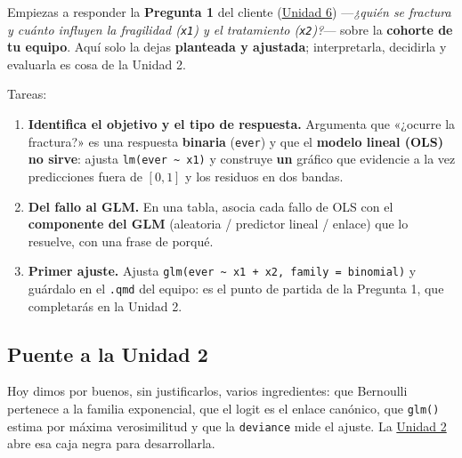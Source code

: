 \documentclass[
  letterpaper,
  DIV=11,
  numbers=noendperiod]{scrartcl}
\providecommand{\tightlist}{%
  \setlength{\itemsep}{0pt}\setlength{\parskip}{0pt}}\usepackage{longtable,booktabs,array}
\begin{document}
\begin{tcolorbox}[enhanced jigsaw, coltitle=black, rightrule=.15mm, arc=.35mm, leftrule=.75mm, colback=white, colbacktitle=quarto-callout-important-color!10!white, left=2mm, breakable, toptitle=1mm, toprule=.15mm, bottomtitle=1mm, titlerule=0mm, title=\textcolor{quarto-callout-important-color}{\faExclamation}\hspace{0.5em}{Tarea del estudiante (1.1) --- arranca la Pregunta 1 del caso}, bottomrule=.15mm, opacityback=0, opacitybacktitle=0.6, colframe=quarto-callout-important-color-frame]

Empiezas a responder la \textbf{Pregunta 1} del cliente
(\protect\hyperlink{sec-u16}{Unidad 6}) ---\emph{¿quién se fractura y
cuánto influyen la fragilidad (\texttt{x1}) y el tratamiento
(\texttt{x2})?}--- sobre la \textbf{cohorte de tu equipo}. Aquí solo la
dejas \textbf{planteada y ajustada}; interpretarla, decidirla y
evaluarla es cosa de la Unidad 2.

Tareas:

\begin{enumerate}
\def\labelenumi{\arabic{enumi}.}
\tightlist
\item
  \textbf{Identifica el objetivo y el tipo de respuesta.} Argumenta que
  «¿ocurre la fractura?» es una respuesta \textbf{binaria}
  (\texttt{ever}) y que el \textbf{modelo lineal (OLS) no sirve}: ajusta
  \texttt{lm(ever\ \textasciitilde{}\ x1)} y construye \textbf{un}
  gráfico que evidencie a la vez predicciones fuera de \([0,1]\) y los
  residuos en dos bandas.
\item
  \textbf{Del fallo al GLM.} En una tabla, asocia cada fallo de OLS con
  el \textbf{componente del GLM} (aleatoria / predictor lineal / enlace)
  que lo resuelve, con una frase de porqué.
\item
  \textbf{Primer ajuste.} Ajusta
  \texttt{glm(ever\ \textasciitilde{}\ x1\ +\ x2,\ family\ =\ binomial)}
  y guárdalo en el \texttt{.qmd} del equipo: es el punto de partida de
  la Pregunta 1, que completarás en la Unidad 2.
\end{enumerate}

\end{tcolorbox}

\hypertarget{sec-u11-puente}{%
\subsection{Puente a la Unidad 2}\label{sec-u11-puente}}

Hoy dimos por buenos, sin justificarlos, varios ingredientes: que
Bernoulli pertenece a la familia exponencial, que el logit es el enlace
canónico, que \texttt{glm()} estima por máxima verosimilitud y que la
\texttt{deviance} mide el ajuste. La \protect\hyperlink{sec-u12}{Unidad
2} abre esa caja negra para desarrollarla.
\end{document}
